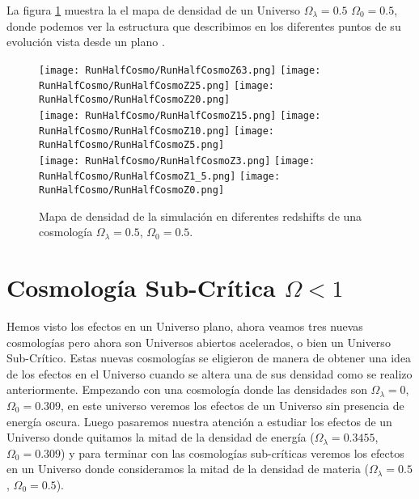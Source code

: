 La figura \ref{fig:HalfCosmo-DensityMap} muestra la el mapa de densidad de un Universo $\Omega_\lambda = 0.5 $ $\Omega_0 = 0.5$, donde podemos ver la estructura que describimos  en los diferentes puntos de su evolución vista desde un plano .
\begin{figure}[H]
    \centering

    \texttt{[image: RunHalfCosmo/RunHalfCosmoZ63.png]}   %
    \texttt{[image: RunHalfCosmo/RunHalfCosmoZ25.png]}   %
    \texttt{[image: RunHalfCosmo/RunHalfCosmoZ20.png]}   %
    \\
    \texttt{[image: RunHalfCosmo/RunHalfCosmoZ15.png]}   %
    \texttt{[image: RunHalfCosmo/RunHalfCosmoZ10.png]}   %
    \texttt{[image: RunHalfCosmo/RunHalfCosmoZ5.png]}    %
    \\
    \texttt{[image: RunHalfCosmo/RunHalfCosmoZ3.png]}    %
    \texttt{[image: RunHalfCosmo/RunHalfCosmoZ1\_5.png]}  %
    \texttt{[image: RunHalfCosmo/RunHalfCosmoZ0.png]}    %
    \caption[Mapa de densidad en en diferentes redshift]{ \footnotesize Mapa de densidad de la simulación en diferentes redshifts de una cosmología $\Omega_\lambda = 0.5 $, $\Omega_0 = 0.5$. }
    \label{fig:HalfCosmo-DensityMap}
\end{figure}

\section[Cosmología Sub-Crítica \texorpdfstring{$\Omega < 1$}{Omega < 1}]{Cosmología Sub-Crítica \texorpdfstring{$\Omega < 1$}{Omega < 1}}

\noindent Hemos visto los efectos en un Universo plano, ahora veamos tres nuevas cosmologías pero ahora son Universos abiertos acelerados, o bien un Universo Sub-Crítico. Estas nuevas cosmologías se eligieron de manera de obtener una idea de los efectos en el Universo cuando se altera una de sus densidad como se realizo anteriormente. Empezando con una cosmología donde las densidades son $\Omega_\lambda = 0$, $\Omega_0 = 0.309$, en este universo veremos los efectos de un Universo sin presencia de energía oscura. Luego pasaremos nuestra atención a estudiar los efectos de un Universo donde quitamos la mitad de la densidad de energía ($\Omega_\lambda = 0.3455$, $\Omega_0 = 0.309$) y para terminar con las cosmologías sub-críticas veremos los efectos en un Universo donde consideramos la mitad de la densidad de materia ($\Omega_\lambda = 0.5$, $\Omega_0 = 0.5$).

